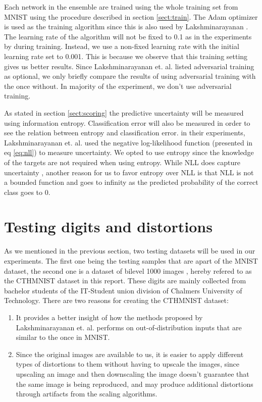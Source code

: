 Each network in the ensemble are trained using the whole training set from MNIST using the procedure described in section \ref{sect:train}. The Adam optimizer is used as the training algorithm \cite{kingma2014adam} since this is also used by Lakshminarayanan \cite{lakshminarayanan2017simple}. The learning rate of the algorithm will not be fixed to 0.1 as in the experiments by \cite{lakshminarayanan2017simple} during training. Instead, we use a non-fixed learning rate with the initial learning rate set to 0.001. This is because we observe that this training setting gives us better results. Since Lakshminarayanan et. al. \cite{lakshminarayanan2017simple} listed adversarial training as optional, we only briefly compare the results of using adversarial training with the once without. In majority of the experiment, we don't use adversarial training.

As stated in section \ref{sect:scoring} the predictive uncertainty will be measured using information entropy. Classification error will also be measured in order to see the relation between entropy and classification error. in their experiments, Lakshminarayanan et. al. \cite{lakshminarayanan2017simple} used the negative log-likelihood function (presented in eq \eqref{eq:nll}) to measure uncertainty. We opted to use entropy since the knowledge of the targets are not required when using entropy. While NLL does capture uncertainty \cite{quinonero2006evaluating}, another reason for us to favor entropy over NLL is that NLL is not a bounded function and goes to infinity as the predicted probability of the correct class goes to 0.

\section{Testing digits and distortions}

As we mentioned in the previous section, two testing datasets will be used in our experiments. The first one being the testing samples that are apart of the MNIST dataset, the second one is a dataset of bilevel 1000 images , hereby refered to as the CTHMNIST dataset in this report. These digits are mainly collected from bachelor students of the IT-Student union division of Chalmers University of Technology. There are two reasons for creating the CTHMNIST dataset:
\begin{enumerate}
    \item It provides a better insight of how the methods proposed by Lakshminarayanan et. al. performs on out-of-distribution inputs that are similar to the once in MNIST.
    \item Since the original images are available to us, it is easier to apply different types of distortions to them without having to upscale the images, since upscaling an image and then downscaling the image doesn't guarantee that the same image is being reproduced, and may produce additional distortions through artifacts from the scaling algorithms\cite{amanatiadis2008performance}.
\end{enumerate}

